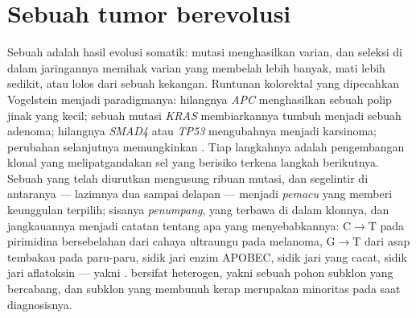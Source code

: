 \section{Sebuah tumor berevolusi}

\begin{proposition}\label{prop:b3:cancer-biology:multistep}
%
Sebuah  adalah hasil evolusi somatik: mutasi menghasilkan
varian, dan seleksi di dalam jaringannya memihak varian yang membelah lebih
banyak, mati lebih sedikit, atau lolos dari sebuah kekangan. Runtunan
kolorektal yang dipecahkan Vogelstein menjadi paradigmanya: hilangnya
\emph{APC} menghasilkan sebuah polip jinak yang kecil; sebuah mutasi
\emph{KRAS} membiarkannya tumbuh menjadi sebuah adenoma; hilangnya
\emph{SMAD4} atau \emph{TP53} mengubahnya menjadi karsinoma; perubahan
selanjutnya memungkinkan . Tiap langkahnya adalah pengembangan klonal
yang melipatgandakan sel yang berisiko terkena langkah berikutnya. Sebuah
 yang telah diurutkan mengusung ribuan mutasi, dan segelintir di
antaranya --- lazimnya dua sampai delapan --- menjadi \emph{pemacu} yang
memberi keunggulan terpilih; sisanya \emph{penumpang}, yang terbawa di dalam
klonnya, dan jangkauannya menjadi catatan tentang apa yang menyebabkannya:
C$\to$T pada pirimidina bersebelahan dari cahaya ultraungu pada melanoma,
G$\to$T dari asap tembakau pada  paru-paru, sidik jari enzim APOBEC,
sidik jari  yang cacat, sidik jari aflatoksin --- yakni
\emph{}.  bersifat heterogen, yakni sebuah pohon
subklon yang bercabang, dan subklon yang membunuh kerap merupakan minoritas
pada saat diagnosisnya.
\end{proposition}

